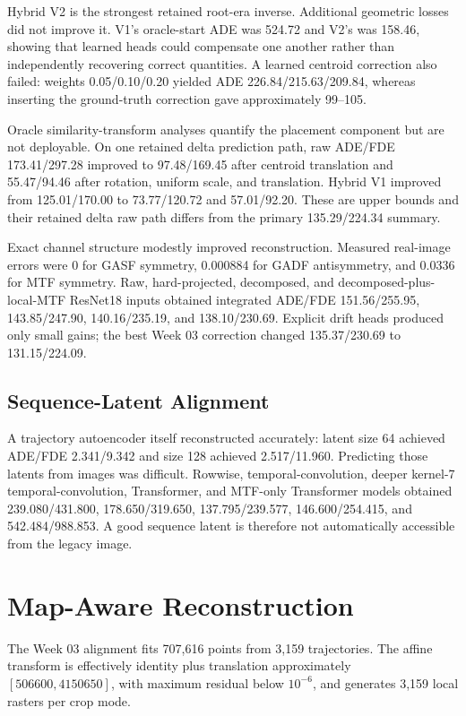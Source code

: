 \documentclass[12pt,a4paper,oneside]{report}
\begin{document}
Hybrid V2 is the strongest retained root-era inverse. Additional geometric losses did not improve it. V1's oracle-start ADE was 524.72 and V2's was 158.46, showing that learned heads could compensate one another rather than independently recovering correct quantities. A learned centroid correction also failed: weights 0.05/0.10/0.20 yielded ADE 226.84/215.63/209.84, whereas inserting the ground-truth correction gave approximately 99--105.

Oracle similarity-transform analyses quantify the placement component but are not deployable. On one retained delta prediction path, raw ADE/FDE 173.41/297.28 improved to 97.48/169.45 after centroid translation and 55.47/94.46 after rotation, uniform scale, and translation. Hybrid V1 improved from 125.01/170.00 to 73.77/120.72 and 57.01/92.20. These are upper bounds and their retained delta raw path differs from the primary 135.29/224.34 summary.

Exact channel structure modestly improved reconstruction. Measured real-image errors were 0 for GASF symmetry, 0.000884 for GADF antisymmetry, and 0.0336 for MTF symmetry. Raw, hard-projected, decomposed, and decomposed-plus-local-MTF ResNet18 inputs obtained integrated ADE/FDE 151.56/255.95, 143.85/247.90, 140.16/235.19, and 138.10/230.69. Explicit drift heads produced only small gains; the best Week 03 correction changed 135.37/230.69 to 131.15/224.09.

\subsection{Sequence-Latent Alignment}

A trajectory autoencoder itself reconstructed accurately: latent size 64 achieved ADE/FDE 2.341/9.342 and size 128 achieved 2.517/11.960. Predicting those latents from images was difficult. Rowwise, temporal-convolution, deeper kernel-7 temporal-convolution, Transformer, and MTF-only Transformer models obtained 239.080/431.800, 178.650/319.650, 137.795/239.577, 146.600/254.415, and 542.484/988.853. A good sequence latent is therefore not automatically accessible from the legacy image.

\section{Map-Aware Reconstruction}

The Week 03 alignment fits 707,616 points from 3,159 trajectories. The affine transform is effectively identity plus translation approximately $[506600,4150650]$, with maximum residual below $10^{-6}$, and generates 3,159 local rasters per crop mode.
\end{document}
